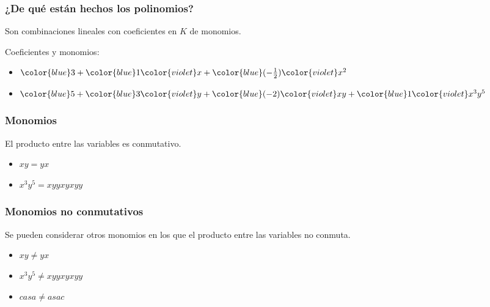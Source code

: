 \documentclass[spanish, aspectratio=169, hidecontrols]{beamer}
\begin{document}
\begin{frame}
  \frametitle{¿De qué están hechos los polinomios?}
  \pause
  Son combinaciones lineales con coeficientes en $K$ de monomios.
  \begin{exampleblock}{}
    {\color{blue}Coeficientes} y {\color{violet}monomios}:
    \begin{itemize}
      \item ${\color{blue}3} + {\color{blue}1} {\color{violet}x} + {\color{blue}(-\frac{1}{2})} {\color{violet}x^2}$
      \item ${\color{blue}5} + {\color{blue}3} {\color{violet}y} + {\color{blue}(-2)} {\color{violet}x y} + {\color{blue}1} {\color{violet}x^3 y^5}$
    \end{itemize}
  \end{exampleblock}
\end{frame}

\begin{frame}
  \frametitle{Monomios}
  \pause
  El producto entre las variables es conmutativo.
  \pause
  \begin{exampleblock}{}
    \begin{itemize}
      \item $xy = yx$
      \item $x^3 y^5 = xyyxyxyy$
    \end{itemize}
  \end{exampleblock}

\end{frame}

\begin{frame}
  \frametitle{Monomios no conmutativos}
  \pause
  Se pueden considerar otros monomios en los que el producto entre las variables no conmuta.
  \begin{exampleblock}{}
    \begin{itemize}
      \item $xy ≠ yx$
      \item $x^3 y^5 ≠ xyyxyxyy$
      \item $casa ≠ asac$
    \end{itemize}
  \end{exampleblock}
\end{frame}
\end{document}
